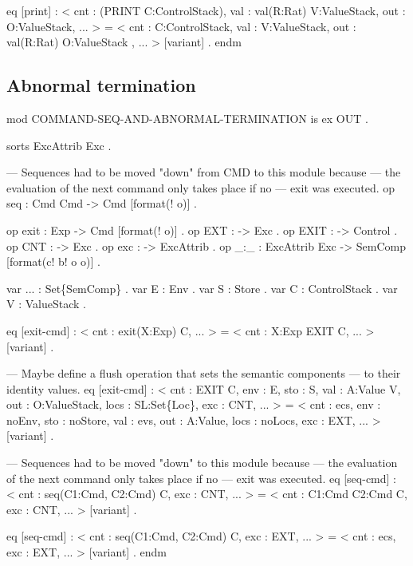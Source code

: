 \documentclass{llncs}%
\begin{document}
    eq [print] :
        < cnt : (PRINT C:ControlStack),
          val : val(R:Rat) V:ValueStack,
          out : O:ValueStack, ... > =
        < cnt : C:ControlStack,
          val : V:ValueStack,
          out : val(R:Rat) O:ValueStack , ... > [variant] .
endm
\nwendcode{}\nwdocspar

\subsection{Abnormal termination}
\nwenddocs{}\endmoddef\nwstartdeflinemarkup\nwenddeflinemarkup
mod COMMAND-SEQ-AND-ABNORMAL-TERMINATION is
    ex OUT .

    sorts ExcAttrib Exc .
    
    --- Sequences had to be moved "down" from CMD to this module because
    --- the evaluation of the next command only takes place if no
    --- exit was executed.
    op seq : Cmd Cmd -> Cmd [format(! o)] .

    op exit : Exp -> Cmd [format(! o)] .
    op EXT : -> Exc .
    op EXIT : -> Control .
    op CNT : -> Exc .
    op exc : -> ExcAttrib .
    op _:_ : ExcAttrib Exc -> SemComp [format(c! b! o o)] .

    var ... : Set\{SemComp\} . var E : Env . var S : Store .
    var C : ControlStack . var V : ValueStack .

    eq [exit-cmd] :
        < cnt : exit(X:Exp) C, ... > = < cnt : X:Exp EXIT C, ... > [variant] .

    --- Maybe define a flush operation that sets the semantic components
    --- to their identity values.
    eq [exit-cmd] :
        < cnt : EXIT C,
          env : E,
          sto : S,
          val : A:Value V,
          out : O:ValueStack,
          locs : SL:Set\{Loc\},
          exc : CNT, ... > =
        < cnt : ecs,
          env : noEnv,
          sto : noStore,
          val : evs,
          out : A:Value,
          locs : noLocs,
          exc : EXT, ... > [variant] .

    --- Sequences had to be moved "down" to this module because
    --- the evaluation of the next command only takes place if no
    --- exit was executed.
    eq [seq-cmd] :
        < cnt : seq(C1:Cmd, C2:Cmd) C, exc : CNT, ... > =
        < cnt : C1:Cmd C2:Cmd C, exc : CNT, ... > [variant] .

    eq [seq-cmd] :
        < cnt : seq(C1:Cmd, C2:Cmd) C, exc : EXT, ... > =
        < cnt : ecs, exc : EXT, ... > [variant] .
endm
\nwendcode{}\nwdocspar
\end{document}
